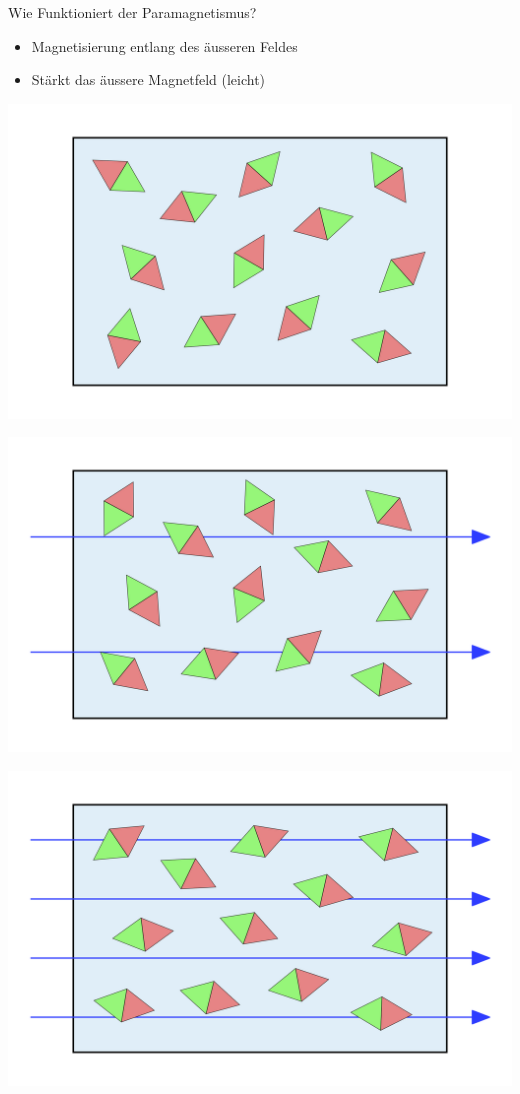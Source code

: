 \begin{karte}{Wie Funktioniert der Paramagnetismus?}
	\begin{itemize}
		\item Magnetisierung entlang des äusseren Feldes
		\item Stärkt das äussere Magnetfeld (leicht)
	\end{itemize}
	\begin{center}
		\begin{minipage}{0.32\textwidth}
			\includegraphics[width=\textwidth]{pics/MS_Paramagnetismus_1.png}
		\end{minipage}
		\begin{minipage}{0.32\textwidth}
			\includegraphics[width=\textwidth]{pics/MS_Paramagnetismus_2.png}
		\end{minipage}
		\begin{minipage}{0.32\textwidth}
			\includegraphics[width=\textwidth]{pics/MS_Paramagnetismus_3.png}

\end{minipage}
\end{center}
\end{karte}
